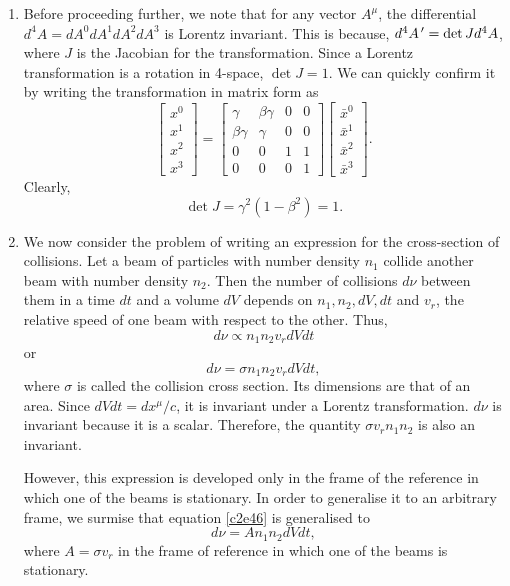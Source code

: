 \begin{enumerate}
\item Before proceeding further, we note that for any vector $A^\mu$, the 
differential $d^4A = dA^0dA^1dA^2dA^3$ is Lorentz invariant. This is because, 
$d^4A^{\,\prime} = \det J  d^4A$, where $J$ is the Jacobian for the transformation. 
Since a Lorentz transformation is a rotation in 4-space, $\det J = 1$. We can 
quickly confirm it by writing the transformation in matrix form as
\[
\begin{bmatrix}x^0 \\ x^1 \\ x^2 \\ x^3\end{bmatrix} = 
\begin{bmatrix} \gamma & \beta\gamma & 0 & 0 \\
\beta\gamma & \gamma & 0 & 0 \\
0 & 0 & 1 & 1 \\
0 & 0 & 0 & 1\end{bmatrix}
\begin{bmatrix}\bar{x}^0 \\ \bar{x}^1 \\ \bar{x}^2 \\ \bar{x}^3\end{bmatrix}.
\]
Clearly,
\[
\det J = \gamma^2(1 - \beta^2) = 1.
\]

\item We now consider the problem of writing an expression for the cross-section
of collisions. Let a beam of particles with number density $n_1$ collide another
beam with number density $n_2$. Then the number of collisions $d\nu$ between 
them in a time $dt$ and a volume $dV$ depends on $n_1, n_2, dV, dt$ and $v_r$, 
the relative speed of one beam with respect to the other. Thus,
\[
d\nu \propto n_1n_2v_r dVdt
\]
or
\begin{equation}\label{c2e46}
d\nu = \sigma n_1n_2v_r dVdt,
\end{equation}
where $\sigma$ is called the collision cross section. Its dimensions are that of
an area. Since $dVdt = dx^\mu/c$, it is invariant under a Lorentz 
transformation.  $d\nu$ is invariant because it is a scalar. Therefore, the 
quantity $\sigma v_r n_1n_2$ is also an invariant.

However, this expression is developed only in the frame of the reference in 
which one of the beams is stationary. In order to generalise it to an arbitrary 
frame, we surmise that equation \eqref{c2e46} is generalised to
\begin{equation}\label{c2e47}
d\nu = An_1n_2dVdt,
\end{equation}
where $A = \sigma v_r$ in the frame of reference in which one of the beams is
stationary. 


\end{enumerate}
